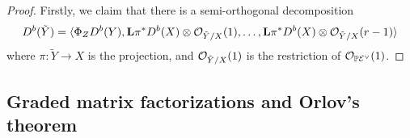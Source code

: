 \begin{proof}
    Firstly, we claim that there is a semi-orthogonal decomposition
    \begin{equation*}
        D^b(\tilde Y)
            = \langle\Phi_ZD^b(Y),
                \mathbf{L}\pi^*D^b(X)\otimes\mathcal{O}_{\tilde Y/X}(1),\ldots,
                \mathbf{L}\pi^*D^b(X)\otimes\mathcal{O}_{\tilde Y/X}(r-1)\rangle
    \end{equation*}
    where $\pi:\tilde Y\to X$ is the projection, and $\mathcal{O}_{\tilde Y/X}(1)$ is the
    restriction of $\mathcal{O}_{\mathbb{P}\mathcal{E}^\vee}(1)$.

\end{proof}


\subsection{Graded matrix factorizations and Orlov's theorem}


